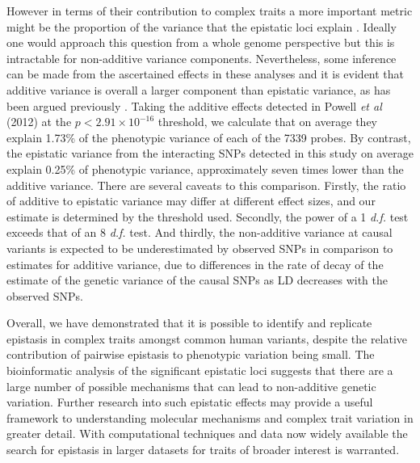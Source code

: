 \documentclass{article}
\begin{document}
However in terms of their contribution to complex traits a more important metric might be the proportion of the variance that the epistatic loci explain \cite{Hill2008a}. Ideally one would approach this question from a whole genome perspective \cite{Visscher2008} but this is intractable for non-additive variance components. Nevertheless, some inference can be made from the ascertained effects in these analyses and it is evident that additive variance is overall a larger component than epistatic variance, as has been argued previously \cite{Hill2008a, Crow2010}. Taking the additive effects detected in Powell \emph{et al} (2012) at the $p < 2.91 \times 10^{-16}$ threshold, we calculate that on average they explain 1.73\% of the phenotypic variance of each of the 7339 probes. By contrast, the epistatic variance from the interacting SNPs detected in this study on average explain 0.25\% of phenotypic variance, approximately seven times lower than the additive variance. There are several caveats to this comparison. Firstly, the ratio of additive to epistatic variance may differ at different effect sizes, and our estimate is determined by the threshold used. Secondly, the power of a 1 \emph{d.f.} test exceeds that of an 8 \emph{d.f.} test. And thirdly, the non-additive variance at causal variants is expected to be underestimated by observed SNPs in comparison to estimates for additive variance, due to differences in the rate of decay of the estimate of the genetic variance of the causal SNPs as LD decreases with the observed SNPs.


Overall, we have demonstrated that it is possible to identify and replicate epistasis in complex traits amongst common human variants, despite the relative contribution of pairwise epistasis to phenotypic variation being small. The bioinformatic analysis of the significant epistatic loci suggests that there are a large number of possible mechanisms that can lead to non-additive genetic variation. Further research into such epistatic effects may provide a useful framework to understanding molecular mechanisms and complex trait variation in greater detail. With computational techniques and data now widely available the search for epistasis in larger datasets for traits of broader interest is warranted.
\end{document}
